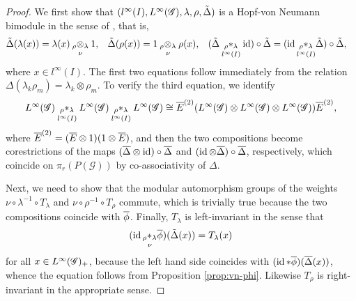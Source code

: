 \begin{proof}
We first show that  $(l^{\infty}(I),L^{\infty}(\mathscr{G}),
\lambda,\rho,\tilde\Delta)$ is  a Hopf-von
  Neumann bimodule in the sense of  \cite{Val1}, that is, 
  \begin{align*}
  \tilde\Delta(\lambda(x)) &= \lambda(x) \underset{\nu{}}{_{\rho}\otimes_{\lambda}} 1, &
  \tilde\Delta(\rho(x)) &= 1 \underset{\nu{}}{_{\rho}\otimes_{\lambda}} \rho(x), &
  (\tilde\Delta \underset{l^{\infty}(I)}{_{\rho}\ast_{\lambda}} \operatorname{id})\circ \tilde\Delta &= (\operatorname{id} \underset{l^{\infty}(I)}{_{\rho}\ast_{\lambda}}
    \tilde\Delta) \circ \tilde\Delta,
\end{align*}
where $x\in l^{\infty}(I)$.
The first two equations follow immediately from the relation
$\Delta(\lambda_{k}\rho_{m})=\lambda_{k} \otimes \rho_{m}$. To verify
the third equation, we identify
\begin{align*}
 L^{\infty}(\mathscr{G}) \underset{l^{\infty}(I)}{_{\rho}\ast_{\lambda}} L^{\infty}(\mathscr{G}) \underset{l^{\infty}(I)}{_{\rho}\ast_{\lambda}} L^{\infty}(\mathscr{G}) \cong \overline{E}^{(2)}(L^{\infty}(\mathscr{G})
  \otimes L^{\infty}(\mathscr{G}) \otimes L^{\infty}(\mathscr{G}))\overline{E}^{(2)},
\end{align*}
where $\overline{E}^{(2)}=(\overline{E} \otimes 1)(1 \otimes \overline{E})$, and then the two
compositions  become corestrictions of the maps $(\overline{\Delta} \otimes
\operatorname{id})\circ \overline{\Delta}$ and $(\operatorname{id} \otimes \overline{\Delta})\circ \overline{\Delta}$,
respectively, which coincide on $\pi_{r}(P(\mathscr{G}))$ by
co-associativity of $\Delta$. 

Next, we need to
show that the modular automorphism groups of the weights $\nu \circ
\lambda^{-1} \circ T_{\lambda}$ and $\nu \circ \rho^{-1} \circ
T_{\rho}$ commute, which is trivially true because the two
compositions coincide with $\overline{\phi}$. Finally,
$T_{\lambda}$ is left-invariant in the sense that
  \begin{align*}
   (\operatorname{id} \underset{\nu}{_{\rho}\ast_{\lambda}} \overline{\phi})(\tilde\Delta(x)) = T_{\lambda}(x) 
  \end{align*}
  for all $x\in L^{\infty}(\mathscr{G})_{+}$, because the left hand
  side coincides with $(\operatorname{id} \ast \overline{\phi})(\overline{\Delta}(x))$, whence the
  equation follows from Proposition
  \ref{prop:vn-phi}. Likewise $T_{\rho}$ is right-invariant in
  the appropriate sense. 
\end{proof}

